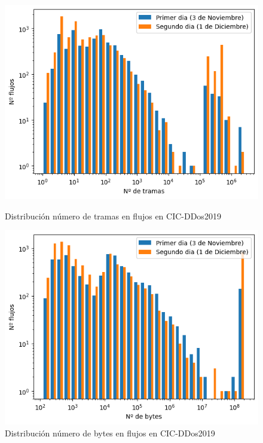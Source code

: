\begin{figure}[H]
      \includegraphics[width=\linewidth]{media/cicddos_2019_pcap_frames_distribution.png}
      \captionsetup{justification=centering}
      \caption{Distribución número de tramas en flujos en CIC-DDos2019}\label{fig:cicddos_2019_pcap_frames_distribution}
    \endminipage\hfill
      \includegraphics[width=\linewidth]{media/cicddos_2019_pcap_bytes_distribution.png}
      \captionsetup{justification=centering}
      \caption{Distribución número de bytes en flujos en CIC-DDos2019}\label{fig:cicddos_2019_pcap_bytes_distribution}
    \endminipage\hfill
\end{figure}

